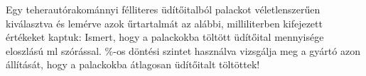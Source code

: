 Egy teherautórakománnyi félliteres üdítőitalból  palackot véletlenszerűen
kiválasztva és lemérve azok űrtartalmát az alábbi, milliliterben kifejezett értékeket
kaptuk:
Ismert, hogy a palackokba töltött üdítőital mennyisége  eloszlású
 ml szórással. \%-os döntési szintet használva vizsgálja meg a gyártó azon
állítását, hogy a palackokba átlagosan  üdítőitalt töltöttek!
